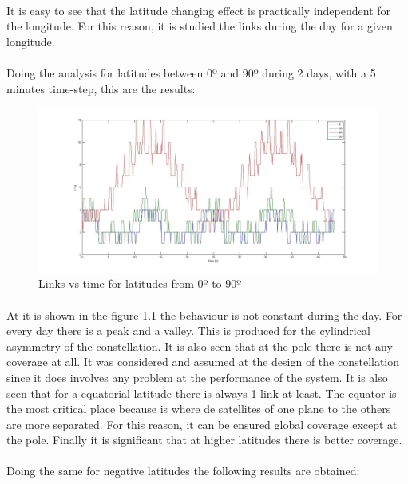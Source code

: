 \documentclass[12pt,a4paper]{report}
\begin{document}
\paragraph{}
It is easy to see that the latitude changing effect is practically independent for the longitude. For this reason, it is studied the links during the day for a given longitude. 
\paragraph{}
Doing the analysis for latitudes between 0º and 90º during 2 days, with a 5 minutes time-step, this are the results:

\begin{figure}[H]
\begin{center}
\includegraphics[scale=0.30]{0_30_90_lat.jpg}
\caption{Links vs time for latitudes from 0º to 90º}
\end{center}
\end{figure}

\paragraph{}
At it is shown in the figure 1.1 the behaviour is not constant during the day. For every day there is a peak and a valley. This is produced for the cylindrical asymmetry of the constellation. It is also seen that at the pole there is not any coverage at all. It was considered and assumed at the design of the constellation since it does involves any problem at the performance of the system. It is also seen that for a equatorial latitude there is always 1 link at least. The equator is the most critical place because is where de satellites of one plane to the others are more separated. For this reason, it can be ensured global coverage except at the pole. Finally it is significant that at higher latitudes there is better coverage.
\paragraph{}
Doing the same for negative latitudes the following results are obtained:
\end{document}
